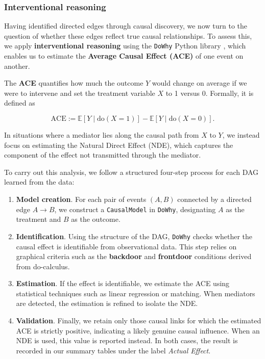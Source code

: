 \documentclass[
]{article}
\theoremstyle{definition}
\theoremstyle{remark}
\begin{document}
\subsubsection{Interventional reasoning}\label{sec-quant_CausalEffects}

Having identified directed edges through causal discovery, we now turn
to the question of whether these edges reflect true causal
relationships. To assess this, we apply \textbf{interventional
reasoning} using the \texttt{DoWhy} Python library
, which enables us to estimate the
\textbf{Average Causal Effect (ACE)} of one event on another.

The \textbf{ACE} quantifies how much the outcome \(Y\) would change on
average if we were to intervene and set the treatment variable \(X\) to
1 versus 0. Formally, it is defined as

\[
\text{ACE} := \mathbb{E}[Y \mid \text{do}(X=1)] - \mathbb{E}[Y \mid \text{do}(X=0)].
\]

In situations where a mediator lies along the causal path from \(X\) to
\(Y\), we instead focus on estimating the Natural Direct Effect (NDE),
which captures the component of the effect not transmitted through the
mediator.

To carry out this analysis, we follow a structured four-step process for
each DAG learned from the data:

\begin{enumerate}
\def\labelenumi{\arabic{enumi}.}
\item
  \textbf{Model creation}. For each pair of events \((A, B)\) connected
  by a directed edge \(A \rightarrow B\), we construct a
  \texttt{CausalModel} in \texttt{DoWhy}, designating \(A\) as the
  treatment and \(B\) as the outcome.
\item
  \textbf{Identification}. Using the structure of the DAG,
  \texttt{DoWhy} checks whether the causal effect is identifiable from
  observational data. This step relies on graphical criteria such as the
  \textbf{backdoor} and \textbf{frontdoor} conditions derived from
  do-calculus.
\item
  \textbf{Estimation}. If the effect is identifiable, we estimate the
  ACE using statistical techniques such as linear regression or
  matching. When mediators are detected, the estimation is refined to
  isolate the NDE.
\item
  \textbf{Validation}. Finally, we retain only those causal links for
  which the estimated ACE is strictly positive, indicating a likely
  genuine causal influence. When an NDE is used, this value is reported
  instead. In both cases, the result is recorded in our summary tables
  under the label \emph{Actual Effect}.
\end{enumerate}
\end{document}
